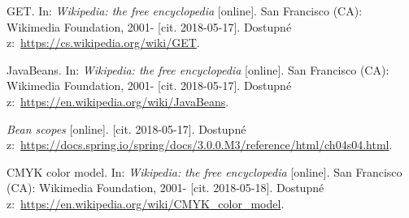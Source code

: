\documentclass[a4paper,12pt]{article}
\begin{document}
{  GET. In: \textit{Wikipedia: the free encyclopedia} [online]. San Francisco (CA): Wikimedia Foundation, 2001- [cit. 2018-05-17]. Dostupné z:~\url{https://cs.wikipedia.org/wiki/GET}.
  
  JavaBeans. In: \textit{Wikipedia: the free encyclopedia} [online]. San Francisco (CA): Wikimedia Foundation, 2001- [cit. 2018-05-17]. Dostupné z:~\url{https://en.wikipedia.org/wiki/JavaBeans}.
  
  \textit{Bean scopes} [online]. [cit. 2018-05-17]. Dostupné z:~\url{https://docs.spring.io/spring/docs/3.0.0.M3/reference/html/ch04s04.html}.
  
  CMYK color model. In: \textit{Wikipedia: the free encyclopedia} [online]. San Francisco (CA): Wikimedia Foundation, 2001- [cit. 2018-05-18]. Dostupné z:~\url{https://en.wikipedia.org/wiki/CMYK_color_model}.
  
}





\seznamobr  %


\seznamtab  %


\seznamscript  %




\end{document}
